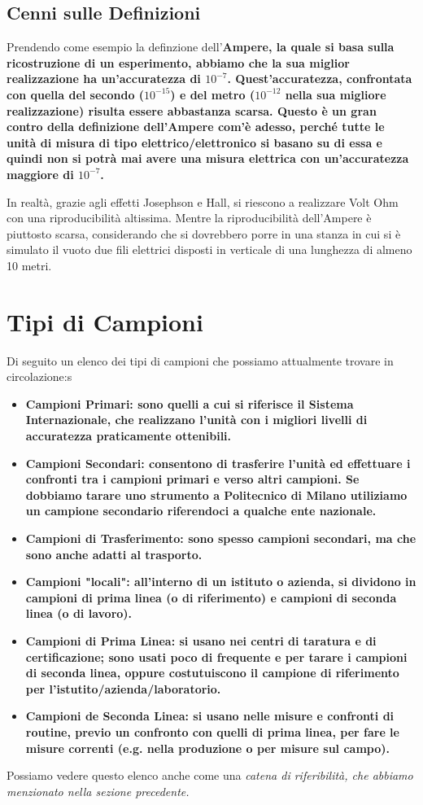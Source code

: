\documentclass[a4paper,11pt]{report}
\begin{document}
\subsection{Cenni sulle Definizioni}
Prendendo come esempio la definzione dell'\bf Ampere\rm, la quale si basa sulla ricostruzione di un esperimento, abbiamo che la sua miglior realizzazione ha un'accuratezza di $10^{-7}$. Quest'accuratezza, confrontata con quella del secondo ($10^{-15}$) e del metro ($10^{-12}$ nella sua migliore realizzazione) risulta essere abbastanza scarsa. Questo è un gran contro della definizione dell'Ampere com'è adesso, perché tutte le unità di misura di tipo elettrico/elettronico si basano su di essa e quindi non si potrà mai avere una misura elettrica con un'accuratezza maggiore di $10^{-7}$.

In realtà, grazie agli effetti Josephson e Hall, si riescono a realizzare Volt Ohm con una riproducibilità altissima. Mentre la riproducibilità dell'Ampere è piuttosto scarsa, considerando che si dovrebbero porre in una stanza in cui si è simulato il vuoto due fili elettrici disposti in verticale di una lunghezza di almeno 10 metri.

\section{Tipi di Campioni}
Di seguito un elenco dei tipi di campioni che possiamo attualmente trovare in circolazione:s
\begin{itemize}
  \item \bf Campioni Primari: \rm sono quelli a cui si riferisce il Sistema Internazionale, che realizzano l'unità con i migliori livelli di accuratezza praticamente ottenibili.
  \item \bf Campioni Secondari: \rm consentono di trasferire l'unità ed effettuare i confronti tra i campioni primari e verso altri campioni. Se dobbiamo tarare uno strumento a Politecnico di Milano utiliziamo un campione secondario riferendoci a qualche ente nazionale.
  \item \bf Campioni di Trasferimento: \rm sono spesso campioni secondari, ma che sono anche adatti al trasporto.
  \item \bf Campioni "locali": \rm all'interno di un istituto o azienda, si dividono in campioni di prima linea (o di riferimento) e campioni di seconda linea (o di lavoro).
  \item \bf Campioni di Prima Linea: \rm si usano nei centri di taratura e di certificazione; sono usati poco di frequente e per tarare i campioni di seconda linea, oppure costutuiscono il campione di riferimento per l'istutito/azienda/laboratorio.
  \item \bf Campioni de Seconda Linea: \rm si usano nelle misure e confronti di routine, previo un confronto con quelli di prima linea, per fare le misure correnti (e.g. nella produzione o per misure sul campo).
\end{itemize}
Possiamo vedere questo elenco anche come una \it catena di riferibilità\rm, che abbiamo menzionato nella sezione precedente.
\end{document}
